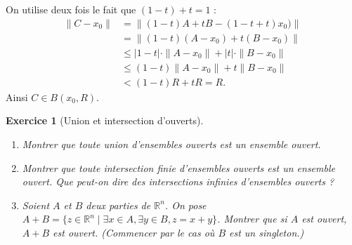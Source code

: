 \documentclass[11pt,a4paper]{article}
\newcommand{\Rr}{\mathbb{R}} \newcommand{\R}{\mathbb{R}}
\renewcommand{\le}{\leqslant} \renewcommand{\leq}{\leqslant}
\theoremstyle{exostyle}
\newtheorem{exo}{Exercice}
\newcommand{\exercice}[1]{} \newcommand{\finexercice}{}
\newcommand{\enonce}{\begin{exo}} \newcommand{\finenonce}{\end{exo}}
\newcommand{\noindication}{\stepcounter{ind}}
\newcommand{\sauteligne}{\leavevmode\vspace{-\baselineskip}}
\begin{document}
\begin{enumerate}
\begin{center}
	\end{center}
	
	On utilise deux fois le fait que $(1-t)+t=1$ :
	\begin{align*}
	\| C-x_0 \| 
		&=  \|(1-t)A + t B  - (1-t+t)x_0)  \| \\
	&= \| (1-t)(A-x_0) +t(B-x_0) \| \\
	&\le  |1-t| \cdot \|A-x_0\|+|t|\cdot\|B-x_0\| \\
	&\le  (1-t)\|A-x_0\|+t\|B-x_0\| \\	
	&< (1-t)R+tR = R.  
	\end{align*}
	Ainsi $C \in B(x_0,R)$.
		
\end{enumerate} 
\fincorrection
\finexercice


\exercice{1742, drutu, 2003/10/01}

\enonce[Union et intersection d'ouverts]
\sauteligne
\begin{enumerate}
	\item Montrer que toute union d'ensembles ouverts est un ensemble ouvert. 
	\item Montrer que toute intersection finie d'ensembles ouverts est un ensemble ouvert. 
   Que peut-on dire des intersections infinies d'ensembles ouverts ?
   \item Soient $A$ et $B$ deux parties de $\Rr^n$.
   On pose $A+B= \{z\in \Rr^n \mid \exists x\in A, \exists y\in B, z=x+y\}$.    
   Montrer que si $A$ est ouvert, $A+B$ est ouvert. (Commencer par le cas où $B$ est un singleton.)
\end{enumerate}
\finenonce

\noindication
\end{document}
